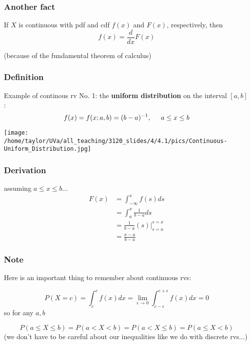 \documentclass{beamer}
\begin{document}
\begin{frame}
\frametitle{Another fact}

If $X$ is continuous with pdf and cdf $f(x)$ and $F(x)$, respectively, then
\[
f(x) = \frac{d}{dx}F(x)
\]

(because of the fundamental theorem of calculus)
\end{frame}


\begin{frame}
\frametitle{Definition}

Example of continous rv No. 1: the \textbf{uniform distribution} on the interval $[a,b]$:
\[
f(x) = f(x; a,b) = (b-a)^{-1}, \hspace{5mm} a \le x \le b
\]

\begin{center}
\texttt{[image: /home/taylor/UVa/all\_teaching/3120\_slides/4/4.1/pics/Continuous-Uniform\_Distribution.jpg]}
\end{center}

\end{frame}


\begin{frame}
\frametitle{Derivation}

assuming $a \le x \le b$...
\begin{align*}
F(x) &= \int_{-\infty}^x f(s) ds \\
&= \int_{a}^x \frac{1}{b-a} ds \\
&= \frac{1}{b-a} (s)|_{s=a}^{s=x} \\
&= \frac{x-a}{b-a}
\end{align*}

\end{frame}


\begin{frame}
\frametitle{Note}

Here is an important thing to remember about continuous rvs:

\[
P(X=c) = \int_c^c f(x) dx = \lim_{\epsilon \to 0} \int_{c - \epsilon}^{c+\epsilon} f(x) dx = 0
\]
so for any $a,b$

\[
P(a \le X \le b) = P(a < X < b) = P(a < X \le b) = P(a \le X < b)
\]
(we don't have to be careful about our inequalities like we do with discrete rvs...)
\end{frame}
\end{document}
